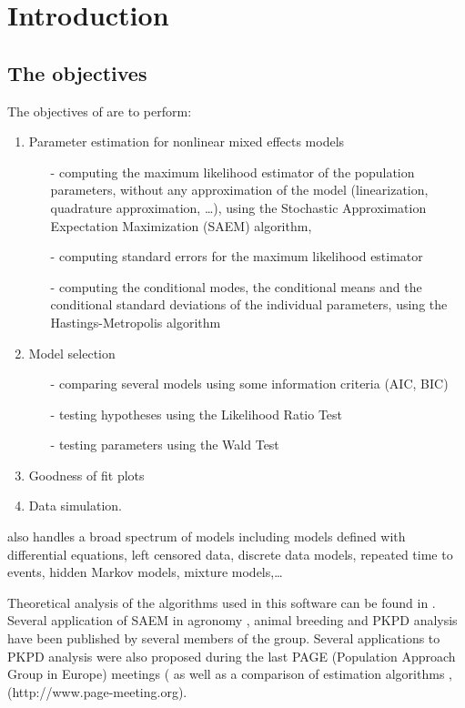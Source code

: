 \chapter{Introduction} \label{chapter_introduction}


\section{The objectives}
The objectives of \monolix are to perform:
\begin{enumerate}
\item Parameter estimation for nonlinear mixed effects models
\begin{itemize}
\item[-] computing the maximum likelihood estimator of the population parameters, without any approximation of the model
(linearization, quadrature approximation, \ldots), using the Stochastic Approximation Expectation
Maximization (SAEM) algorithm,
\item[-] computing standard errors for the maximum likelihood estimator
\item[-] computing the conditional modes, the conditional means and the conditional standard deviations of the individual parameters, using the Hastings-Metropolis algorithm
\end{itemize}
\item Model selection
\begin{itemize}
\item[-] comparing several models using some information criteria (AIC, BIC)
\item[-] testing hypotheses using the Likelihood Ratio Test
\item[-] testing parameters using the Wald Test
\end{itemize}
\item Goodness of fit plots
\item Data simulation.
\end{enumerate}
\monolix also handles a broad spectrum of models including models defined with differential equations, left censored data, discrete data models, repeated time to events, hidden Markov models, mixture models,\ldots

Theoretical  analysis of the algorithms used in this software can be found in \cite{marc, samson_jspi06, kuhn01, kl05}. Several application of SAEM
in agronomy \cite{mako06}, animal breeding \cite{Jaffrezic06} and PKPD analysis \cite{comets07, LM07, samson_csda06, samson_sim06a} have been
published by several members of the \monolix group. Several applications to PKPD analysis were also proposed during the last PAGE (Population
Approach Group in Europe) meetings (\cite{page06a, page05a, page03, page06b, page04a, page06c, page05b} as well as a comparison of estimation
algorithms \cite{page05c}, ({http://www.page-meeting.org}).


